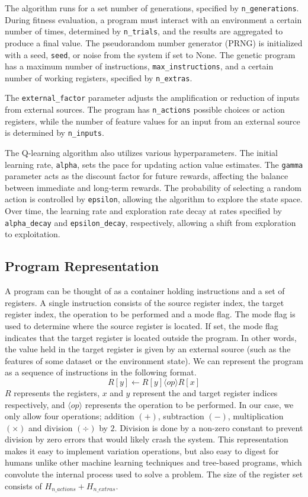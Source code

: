 \documentclass[12pt, final]{dalcsthesis}
\begin{document}
The algorithm runs for a set number of generations, specified by \texttt{n\_generations}. During fitness evaluation, a program must interact with an environment a certain number of times, determined by \texttt{n\_trials}, and the results are aggregated to produce a final value. The pseudorandom number generator (PRNG) is initialized with a seed, \texttt{seed}, or noise from the system if set to None. The genetic program has a maximum number of instructions, \texttt{max\_instructions}, and a certain number of working registers, specified by \texttt{n\_extras}.

The \texttt{external\_factor} parameter adjusts the amplification or reduction of inputs from external sources. The program has \texttt{n\_actions} possible choices or action registers, while the number of feature values for an input from an external source is determined by \texttt{n\_inputs}.

The Q-learning algorithm also utilizes various hyperparameters. The initial learning rate, \texttt{alpha}, sets the pace for updating action value estimates. The \texttt{gamma} parameter acts as the discount factor for future rewards, affecting the balance between immediate and long-term rewards. The probability of selecting a random action is controlled by \texttt{epsilon}, allowing the algorithm to explore the state space. Over time, the learning rate and exploration rate decay at rates specified by \texttt{alpha\_decay} and \texttt{epsilon\_decay}, respectively, allowing a shift from exploration to exploitation.

\subsection{Program Representation}
A program can be thought of as a container holding instructions and a set of registers. A single instruction consists of the source register index, the target register index, the operation to be performed and a mode flag. The mode flag is used to determine where the source register is located. If set, the mode flag indicates that the target register is located outside the program. In other words, the value held in the target register is given by an external source (such as the features of some dataset or the environment state). We can represent the program as a sequence of instructions in the following format. $$R[y] \leftarrow R[y] \langle op \rangle  R[x]$$ $R$ represents the registers, $x$ and $y$ represent the and target register indices respectively, and $\langle op \rangle$ represents the operation to be performed. In our case, we only allow four operations; addition $(+)$,
subtraction $(-)$, multiplication $(\times)$ and division $(\div)$ by $2$. Division is done by a non-zero constant to prevent division by zero errors that would likely crash the system. This representation makes it easy to implement variation operations, but also easy to digest for humans unlike other machine learning techniques and tree-based programs, which convolute the internal process used to solve a problem. The size of the register set consists of $H_{n\_actions} +  H_{n\_extras}$.
\end{document}
